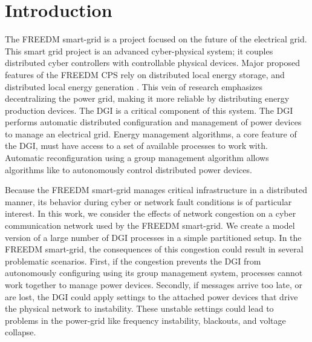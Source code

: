 
\section{Introduction}

The \ac{FREEDM}\cite{FREEDM} smart-grid is a project focused on the future of the electrical grid.
This smart grid project is an advanced cyber-physical system; it couples distributed cyber controllers with controllable physical devices.
Major proposed features of the \ac{FREEDM} \ac{CPS} rely on distributed local energy storage, and distributed local energy generation \cite{FREEDMMIGRATION}.
This vein of research emphasizes decentralizing the power grid, making it more reliable by distributing energy production devices.
The \ac{DGI} is a critical component of this system.
The \ac{DGI} performs automatic distributed configuration and management of power devices to manage an electrical grid.
Energy management algorithms, a core feature of the \ac{DGI}\cite{LOADBALANCING}, must have access to a set of available processes to work with.
Automatic reconfiguration using a group management algorithm allows algorithms like \cite{LOADBALANCING}\cite{ICC1}\cite{MOYEEN} to autonomously control distributed power devices.

Because the \ac{FREEDM} smart-grid manages critical infrastructure in a distributed manner, its behavior during cyber or network fault conditions is of particular interest.
In this work, we consider the effects of network congestion on a cyber communication network used by the \ac{FREEDM} smart-grid.
We create a model version of a large number of \ac{DGI} processes in a simple partitioned setup.
In  the \ac{FREEDM} smart-grid, the consequences of this congestion could result in several problematic scenarios.
First, if the congestion prevents the \ac{DGI} from autonomously configuring using its group management system, processes cannot work together to manage power devices.
Secondly, if messages arrive too late, or are lost, the \ac{DGI} could apply settings to the attached power devices that drive the physical network to instability.
These unstable settings could lead to problems in the power-grid like frequency instability, blackouts, and voltage collapse.

